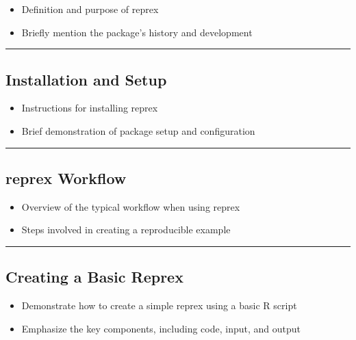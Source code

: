 \documentclass[
  letterpaper,
  DIV=11,
  numbers=noendperiod]{scrartcl}
\providecommand{\tightlist}{%
  \setlength{\itemsep}{0pt}\setlength{\parskip}{0pt}}\usepackage{longtable,booktabs,array}
\begin{document}
\begin{itemize}
\tightlist
\item
  Definition and purpose of reprex
\item
  Briefly mention the package's history and development
\end{itemize}

\begin{center}\rule{0.5\linewidth}{0.5pt}\end{center}

\hypertarget{installation-and-setup}{%
\subsection{Installation and Setup}\label{installation-and-setup}}

\begin{itemize}
\tightlist
\item
  Instructions for installing reprex
\item
  Brief demonstration of package setup and configuration
\end{itemize}

\begin{center}\rule{0.5\linewidth}{0.5pt}\end{center}

\hypertarget{reprex-workflow}{%
\subsection{reprex Workflow}\label{reprex-workflow}}

\begin{itemize}
\tightlist
\item
  Overview of the typical workflow when using reprex
\item
  Steps involved in creating a reproducible example
\end{itemize}

\begin{center}\rule{0.5\linewidth}{0.5pt}\end{center}

\hypertarget{creating-a-basic-reprex}{%
\subsection{Creating a Basic Reprex}\label{creating-a-basic-reprex}}

\begin{itemize}
\tightlist
\item
  Demonstrate how to create a simple reprex using a basic R script
\item
  Emphasize the key components, including code, input, and output
\end{itemize}
\end{document}
